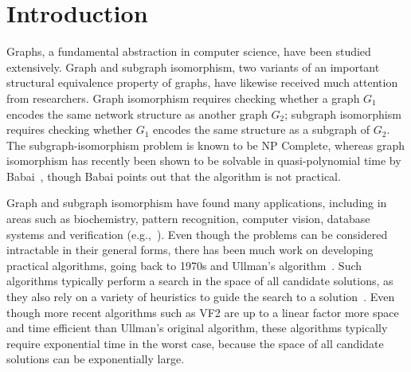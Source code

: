 

%
\section{Introduction}
%
Graphs, a fundamental abstraction in computer science, have been
studied extensively.
%
Graph and subgraph isomorphism, two variants of an important
structural equivalence property of graphs, have likewise received much
attention from researchers.
%
Graph isomorphism requires checking whether a graph $G_1$ encodes the
same network structure as another graph $G_2$; subgraph isomorphism
requires checking whether $G_1$ encodes the same structure as a
subgraph of $G_2$.
%
The subgraph-isomorphism problem is known to be NP Complete, whereas
graph isomorphism has recently been shown to be solvable in
quasi-polynomial time by Babai~\cite{babai}, though Babai points out
that the algorithm is not practical.

Graph and subgraph isomorphism have found many applications, including
in areas such as biochemistry, pattern recognition, computer vision,
database systems and verification
(e.g.,~\cite{patternwithsub1,characterrecognition,subgraphsindatabases,subgraphsinchemistry}).
%
Even though the problems can be considered intractable in their
general forms, there has been much work on developing practical
algorithms, going back to 1970s and Ullman's algorithm~\cite{ullman}.
%
Such algorithms typically perform a search in the space of all
candidate solutions, as they also rely on a variety of heuristics to
guide the search to a solution~\cite{ullman, VF2}.
%
Even though more recent algorithms such as VF2 are up to a linear
factor more space and time efficient than Ullman's original algorithm,
these algorithms typically require exponential time in the worst case,
because the space of all candidate solutions can be exponentially
large.

